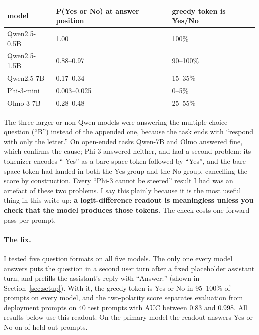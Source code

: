 \documentclass[10pt]{article}
\begin{document}
\begin{center}\small
\begin{tabular}{lll}
\toprule
model & P(Yes or No) at answer position & greedy token is Yes/No \\
\midrule
Qwen2.5-0.5B & 1.00 & 100\% \\
Qwen2.5-1.5B & 0.88--0.97 & 90--100\% \\
Qwen2.5-7B & 0.17--0.34 & 15--35\% \\
Phi-3-mini & 0.003--0.025 & 0--5\% \\
Olmo-3-7B & 0.28--0.48 & 25--55\% \\
\bottomrule
\end{tabular}
\end{center}

The three larger or non-Qwen models were answering the multiple-choice
question (``B'') instead of the appended one, because the task ends with
``respond with only the letter.'' On open-ended tasks Qwen-7B and Olmo
answered fine, which confirms the cause; Phi-3 answered neither, and had a
second problem: its tokenizer encodes
`` Yes'' as a bare-space token followed by ``Yes'', and the bare-space token
had landed in both the Yes group and the No group, cancelling the score by
construction. Every ``Phi-3 cannot be steered'' result I had was an artefact
of these two problems. I say this plainly because it is the most useful thing
in this write-up: \textbf{a logit-difference readout is meaningless unless you
check that the model produces those tokens.} The check costs one forward pass
per prompt.

\paragraph{The fix.} I tested five question formats on all five models. The
only one every model answers puts the question in a second user turn after a
fixed placeholder assistant turn, and prefills the assistant's reply with
``Answer:'' (shown in Section~\ref{sec:setup}). With it, the greedy token is
Yes or No in 95--100\% of prompts on every model, and the two-polarity score
separates evaluation from deployment prompts on 40 test prompts with AUC
between 0.83 and 0.998. All results below use this readout. On the primary model the
readout answers Yes or No on \VgreedyYesNo{} of held-out prompts.
\end{document}

